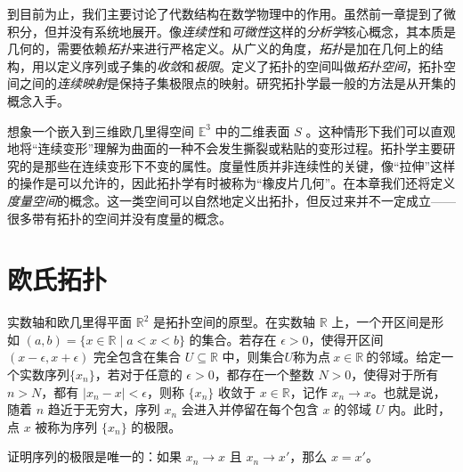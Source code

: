 到目前为止，我们主要讨论了代数结构在数学物理中的作用。虽然前一章提到了微积分，但并没有系统地展开。像\emph{连续性}和\emph{可微性}这样的\emph{分析学}核心概念，其本质是几何的，需要依赖\emph{拓扑}来进行严格定义。从广义的角度，\emph{拓扑}是加在几何上的结构，用以定义序列或子集的\emph{收敛}和\emph{极限}。定义了拓扑的空间叫做\emph{拓扑空间}，拓扑空间之间的\emph{连续映射}是保持子集极限点的映射。研究拓扑学最一般的方法是从开集的概念入手。

想象一个嵌入到三维欧几里得空间 $\mathbb{E}^{3}$ 中的二维表面 $S$ 。这种情形下我们可以直观地将“连续变形”理解为曲面的一种不会发生撕裂或粘贴的变形过程。拓扑学主要研究的是那些在连续变形下不变的属性。度量性质并非连续性的关键，像“拉伸”这样的操作是可以允许的，因此拓扑学有时被称为“橡皮片几何”。在本章我们还将定义\emph{度量空间}的概念。这一类空间可以自然地定义出拓扑，但反过来并不一定成立——很多带有拓扑的空间并没有度量的概念。

\section{欧氏拓扑}

实数轴和欧几里得平面 $\mathbb{R}^{2}$ 是拓扑空间的原型。在实数轴 $\mathbb{R}$ 上，一个开区间是形如 $(a,b)=\{x\in \mathbb{R} \mid a< x< b\}$ 的集合。若存在 $\epsilon  >0$，使得开区间 $(x-\epsilon ,x+\epsilon )$ 完全包含在集合 $U\subseteq \mathbb{R}$ 中，则集合$U$称为点$\ x\in \mathbb{R} \ $的邻域。给定一个实数序列$\{x_{n} \}$，若对于任意的 $\epsilon  >0$，都存在一个整数 $N >0$，使得对于所有 $n >N$，都有 $|x_{n} -x|< \epsilon $，则称 $\{x_{n} \}$ 收敛于 $x\in \mathbb{R}$，记作 $x_{n}\rightarrow x$。也就是说，随着 $ n$ 趋近于无穷大，序列 $x_{n}$ 会进入并停留在每个包含 $x$ 的邻域 $U$ 内。此时，点 $x$ 被称为序列 $\{x_{n} \}$ 的极限。

\begin{exercise}
    证明序列的极限是唯一的：如果 $x_{n}\rightarrow x$ 且 $x_{n}\rightarrow x'$，那么 $x=x'$。
\end{exercise}

